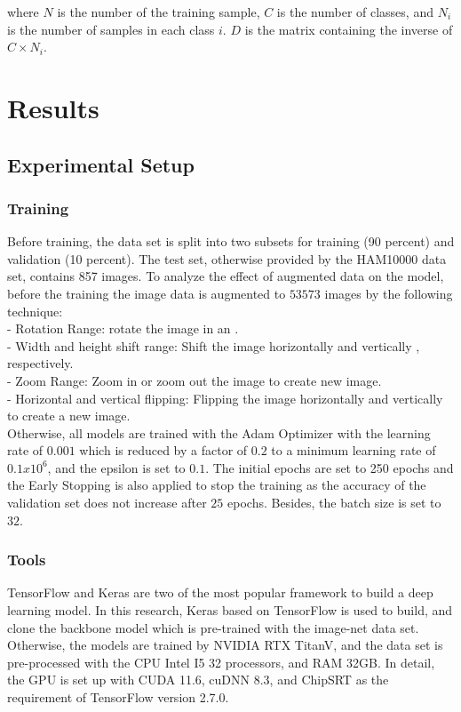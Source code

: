 \documentclass[sensors,article,submit,pdftex,moreauthors]{Definitions/mdpi}
\begin{document}
	where $N$ is the number of the training sample, $C$ is the number of classes, and $N_i$ is the number of samples in each class $i$. $D$ is the matrix containing the inverse of $C \times N_i$. 
	
	\section{Results}
	\subsection{Experimental Setup}
	\subsubsection{Training}
	Before training, the data set is split into two subsets for training (90 percent) and validation (10 percent). The test set, otherwise provided by the HAM10000 data set, contains 857 images. To analyze the effect of augmented data on the model, before the training the image data is augmented to $53573$ images by the following technique:\\
	- Rotation Range: rotate the image in an . \\
	- Width and height shift range: Shift the image horizontally and vertically , respectively. \\
	- Zoom Range:  Zoom in or zoom out the image  to create new image. \\
	- Horizontal and vertical flipping: Flipping the image horizontally and vertically to create a new image.\\
	Otherwise, all models are trained with the Adam Optimizer \cite{6980} with the learning rate of $0.001$ which is reduced by a factor of $0.2$ to a minimum learning rate of $0.1 x 10^6$, and the epsilon is set to $0.1$. The initial epochs are set to 250 epochs and the Early Stopping is also applied to stop the training as the accuracy of the validation set does not increase after $25$ epochs. Besides, the batch size is set to $32$.
	
	\subsubsection{Tools}
	TensorFlow and Keras are two of the most popular framework to build a deep learning model. In this research, Keras based on TensorFlow is used to build, and clone the backbone model which is pre-trained with the image-net data set. Otherwise, the models are trained by NVIDIA RTX TitanV, and the data set is pre-processed with the CPU Intel I5 32 processors, and RAM 32GB. In detail, the GPU is set up with CUDA 11.6, cuDNN 8.3, and ChipSRT as the requirement of TensorFlow version 2.7.0.
\end{document}
